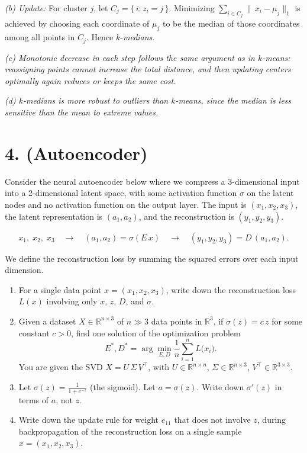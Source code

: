 \documentclass[twocolumn]{article}
\begin{document}
\begin{spacing}{1}
\noindent
\emph{(b) Update:} For cluster $j$, let $C_j=\{\,i : z_i=j\,\}$. Minimizing 
$\sum_{i\in C_j} \|\,x_i - \mu_j\|_1$ is achieved by choosing each coordinate of $\mu_j$ to be 
the median of those coordinates among all points in $C_j$. Hence $k$-\emph{medians}.

\noindent
\emph{(c) Monotonic decrease in each step follows the same argument as in $k$-means: reassigning
points cannot increase the total distance, and then updating centers optimally again reduces or
keeps the same cost.}

\noindent
\emph{(d) $k$-medians is more robust to outliers than $k$-means, since the median is less sensitive
than the mean to extreme values.}

\section{4. (Autoencoder)}

Consider the neural autoencoder below where we compress a 3-dimensional input into a 2-dimensional
latent space, with some activation function $\sigma$ on the latent nodes and no activation function
on the output layer. The input is $(x_1,x_2,x_3)$, the latent representation is $(a_1,a_2)$, and the
reconstruction is $(y_1,y_2,y_3)$.

\[
x_1,\;x_2,\;x_3 \quad\rightarrow\quad
(a_1,a_2) = \sigma(E\,x)
\quad\rightarrow\quad
(y_1,y_2,y_3) = D\,(a_1,a_2).
\]

We define the reconstruction loss by summing the squared errors over each input dimension.

\begin{enumerate}
\item For a single data point $x=(x_1,x_2,x_3)$, write down the reconstruction loss $L(x)$ involving only
$x$, $z$, $D$, and $\sigma$.
\item Given a dataset $X \in \mathbb{R}^{n\times 3}$ of $n\gg 3$ data points in $\mathbb{R}^3$, if $\sigma(z)=c\,z$
for some constant $c>0$, find one solution of the optimization problem
\[
E^*, D^* = \arg\min_{E,D} \frac{1}{n}\sum_{i=1}^n L\bigl(x_i\bigr).
\]
You are given the SVD $X = U\,\Sigma\,V^\top$, with $U\in\mathbb{R}^{n\times n}$, $\Sigma\in\mathbb{R}^{n\times 3}$,
$V^\top\in\mathbb{R}^{3\times 3}$.
\item Let $\sigma(z)=\tfrac{1}{1+e^{-z}}$ (the sigmoid). Let $a = \sigma(z)$. Write down $\sigma'(z)$ in terms
of $a$, not $z$.
\item Write down the update rule for weight $e_{11}$ that does not involve $z$, during backpropagation of the
reconstruction loss on a single sample $x=(x_1,x_2,x_3)$.
\end{enumerate}


\end{spacing}
\end{document}
